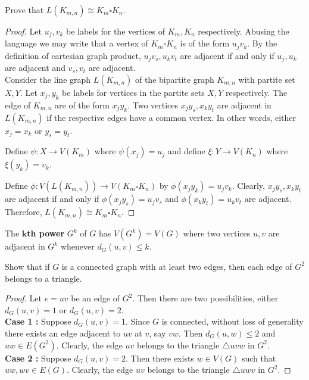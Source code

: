 \begin{exercise}
	Prove that $L(K_{m,n}) \cong K_m \square K_n$.
\end{exercise}
\begin{proof}
	Let $u_j,v_k$ be labels for the vertices of $K_m,K_n$ respectively. Abusing the language we may write that a vertex of $K_m \square K_n$ is of the form $u_jv_k$. By the definition of cartesian graph product, $u_jv_s, u_kv_t$ are adjacent if and only if $u_j,u_k$ are adjacent and $v_s,v_t$ are adjacent.\\

	Consider the line graph $L(K_{m,n})$ of the bipartite graph $K_{m,n}$ with partite set $X,Y$. Let $x_j,y_k$ be labels for vertices in the partite sets $X,Y$ respectively. The edge of $K_{m,n}$ are of the form $x_jy_k$. Two vertices $x_jy_s,x_ky_t$ are adjacent in $L(K_{m,n})$ if the respective edges have a common vertex. In other words, either $x_j = x_k$ or $y_s = y_t$.\\

	\begin{commentary}
	Define $\psi : X \to V(K_m)$ where $\psi(x_j) = u_j$ and define $\xi : Y \to V(K_n)$ where $\xi(y_k) = v_k$.
	\end{commentary}
	Define $\phi : V(L(K_{m,n})) \to V(K_m \square K_n)$ by $\phi(x_jy_k) = u_jv_k$. Clearly, $x_jy_s,x_ky_t$ are adjacent if and only if $\phi(x_jy_s)=u_jv_s$ and $\phi(x_ky_t)=u_kv_t$ are adjacent. Therefore, $L(K_{m,n}) \cong K_m \square K_n$.
\end{proof}

\begin{definition}
	The $\mathbf{k}$\textbf{th power} $G^k$ of $G$ has $V(G^k) = V(G)$ where two vertices $u,v$ are adjacent in $G^k$ whenever $d_G(u,v) \le k$.
\end{definition}

\begin{exercise}
	Show that if $G$ is a connected graph with at least two edges, then each edge of $G^2$ belongs to a triangle.
\end{exercise}
\begin{proof}
	Let $e=uv$ be an edge of $G^2$. Then there are two possibilities, either $d_G(u,v) = 1$ or $d_G(u,v) = 2$.\\

	\textbf{Case 1 :} Suppose $d_G(u,v) = 1$. Since $G$ is connected, without loss of generality there exists an edge adjacent to $uv$ at $v$, say $vw$. Then $d_G(u,w) \le 2$ and $uw \in E(G^2)$. Clearly, the edge $uv$ belongs to the triangle $\triangle uvw$ in $G^2$.\\

	\textbf{Case 2 :} Suppose $d_G(u,v)=2$. Then there exists $w \in V(G)$ such that $uw,wv \in E(G)$. Clearly, the edge $uv$ belongs to the triangle $\triangle uwv$ in $G^2$.
\end{proof}

